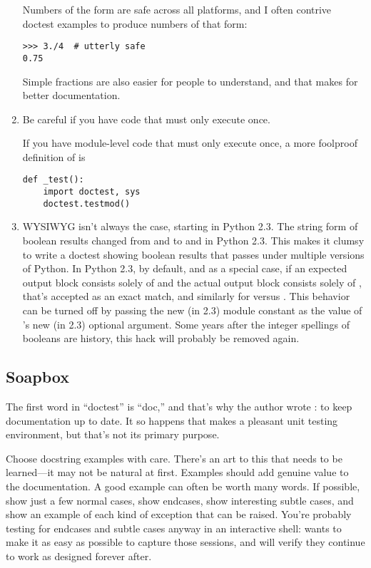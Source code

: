 \begin{enumerate}
Numbers of the form  are safe across all platforms, and I
often contrive doctest examples to produce numbers of that form:

\begin{verbatim}
>>> 3./4  # utterly safe
0.75
\end{verbatim}

Simple fractions are also easier for people to understand, and that makes
for better documentation.

\item Be careful if you have code that must only execute once.

If you have module-level code that must only execute once, a more foolproof
definition of  is

\begin{verbatim}
def _test():
    import doctest, sys
    doctest.testmod()
\end{verbatim}

\item WYSIWYG isn't always the case, starting in Python 2.3.  The
  string form of boolean results changed from  and
   to  and  in Python 2.3.
  This makes it clumsy to write a doctest showing boolean results that
  passes under multiple versions of Python.  In Python 2.3, by default,
  and as a special case, if an expected output block consists solely
  of  and the actual output block consists solely of
  , that's accepted as an exact match, and similarly for
   versus .  This behavior can be turned off by
  passing the new (in 2.3) module constant
   as the value of 's
  new (in 2.3) optional  argument.  Some years after
  the integer spellings of booleans are history, this hack will
  probably be removed again.

\end{enumerate}


\subsection{Soapbox}

The first word in ``doctest'' is ``doc,'' and that's why the author
wrote : to keep documentation up to date.  It so
happens that  makes a pleasant unit testing
environment, but that's not its primary purpose.

Choose docstring examples with care.  There's an art to this that
needs to be learned---it may not be natural at first.  Examples should
add genuine value to the documentation.  A good example can often be
worth many words.  If possible, show just a few normal cases, show
endcases, show interesting subtle cases, and show an example of each
kind of exception that can be raised.  You're probably testing for
endcases and subtle cases anyway in an interactive shell:
 wants to make it as easy as possible to capture
those sessions, and will verify they continue to work as designed
forever after.

